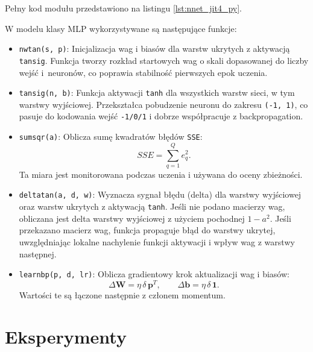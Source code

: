 \documentclass[12pt,twoside]{article}
\begin{document}
Pełny kod modułu przedstawiono na listingu \ref{lst:nnet_jit4_py}.



W modelu klasy MLP wykorzystywane są następujące funkcje:

\begin{itemize}[label={\textbullet}]
\item \texttt{nwtan(s, p)}:
Inicjalizacja wag i biasów dla warstw ukrytych z aktywacją \texttt{tansig}.
Funkcja tworzy rozkład startowych wag o skali dopasowanej do liczby wejść i~neuronów,
co poprawia stabilność pierwszych epok uczenia.

\item \texttt{tansig(n, b)}:
Funkcja aktywacji \texttt{tanh} dla wszystkich warstw sieci, w tym warstwy wyjściowej.
Przekształca pobudzenie neuronu do zakresu \texttt{(-1, 1)}, co pasuje
do kodowania wejść \texttt{-1/0/1} i dobrze współpracuje z backpropagation.

\item \texttt{sumsqr(a)}:
Oblicza sumę kwadratów błędów \texttt{SSE}:
\begin{equation}
SSE = \sum_{q=1}^{Q} e_q^2.
\end{equation}
Ta miara jest monitorowana podczas uczenia i używana do oceny zbieżności.

\item \texttt{deltatan(a, d, w)}:
Wyznacza sygnał błędu (delta) dla warstwy wyjściowej oraz warstw ukrytych z aktywacją \texttt{tanh}.
Jeśli nie podano macierzy wag, obliczana jest delta warstwy wyjściowej z użyciem pochodnej $1-a^2$.
Jeśli przekazano macierz wag, funkcja propaguje błąd do warstwy ukrytej, uwzględniając
lokalne nachylenie funkcji aktywacji i wpływ wag z warstwy następnej.

\item \texttt{learnbp(p, d, lr)}:
Oblicza gradientowy krok aktualizacji wag i biasów:
\begin{equation}
\Delta \mathbf{W} = \eta\, \delta\, \mathbf{p}^T,
\qquad
\Delta \mathbf{b} = \eta\, \delta\, \mathbf{1}.
\end{equation}
Wartości te są łączone następnie z członem momentum.
\end{itemize}



\section{Eksperymenty}
\end{document}
